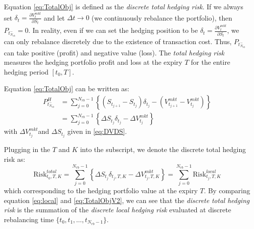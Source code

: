 \documentclass[letterpaper,12pt,titlepage,oneside,final]{book}
\numberwithin{equation}{section}
\theoremstyle{definition}
\newcommand{\DS}{\Delta S}
\newcommand{\Vmkt}{V^{mkt}}
\newcommand{\Smkt}{S}
\begin{document}
Equation \eqref{eq:TotalObj} is defined as the {\em discrete total hedging risk}.
If we always set $\delta_t=\frac{\partial V_t^{mkt}}{\partial S_t}$ and let $\Delta t \rightarrow 0$ (we continuously rebalance the portfolio), then $P_{t_{N_{rb}}^-}=0$. In reality, even if we can set the hedging position to be $\delta_t=\frac{\partial V_t^{mkt}}{\partial S_t}$,  we can only rebalance discretely due to the existence of transaction cost. Thus, $P_{t_{N_{rb}}^-}$ can take positive (profit) and negative value (loss).
The  {\em total hedging risk} measures the hedging portfolio profit and loss at the expiry $T$ for the entire hedging period $[t_0, T]$. 

Equation \eqref{eq:TotalObj} can be written as:
\[
\begin{split}
P^H_{t_{N_{rb}}^-}&=\sum_{j=0}^{N_{rb}-1}\left\{ \left( S_{t_{j+1}}-S_{t_{j}}\right) \delta_{t_j} -(V_{t_{j+1}}^{mkt}-V_{t_j}^{mkt}) \right\}\\
&=\sum_{j=0}^{N_{rb}-1}\left\{ \DS_{t_j} \delta_{t_j} -\Delta V^{mkt}_{t_j} \right\}
\end{split}
\]
with $\Delta V^{mkt}_{t_j}$and  $\DS_{t_j}$ given in \eqref{eq:DVDS}.


Plugging in the $T$ and $K$ into the subscript, we denote the discrete total hedging risk as:
\begin{equation}
    \text{Risk}^{total}_{t_0,T,K}=\sum_{j=0}^{N_{rb}-1}\left\{ \Delta \Smkt_{t_j} \delta_{t_j,T,K} -\Delta \Vmkt_{t_j,T,K} \right\}=\sum_{j=0}^{N_{rb}-1}\text{Risk}^{local}_{t_j,T,K}
    \label{eq:TotalObjV2}
    \end{equation}
which corresponding to the hedging portfolio value at the expiry $T$. 
By comparing equation \eqref{eq:local} and \eqref{eq:TotalObjV2}, we can see that the {\em discrete total hedging risk} is the summation of the {\em discrete local hedging risk} evaluated at discrete rebalancing time $\{t_0,t_1,\dots,t_{N_{rb}-1}\}$. 
\end{document}
